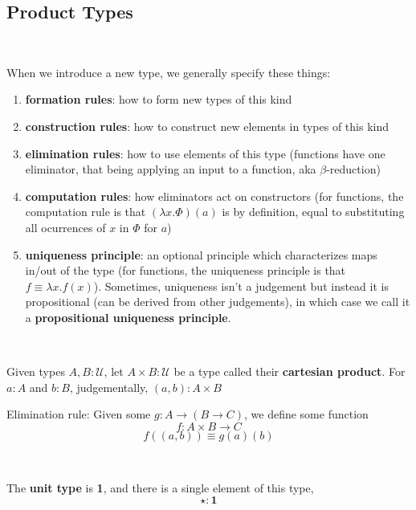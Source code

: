 \documentclass{article}
\begin{document}
\subsection{Product Types}

\begin{remark}
\

When we introduce a new type, we generally specify these things:

\begin{enumerate}
    \item \textbf{formation rules}: how to form new types of this kind
    \item \textbf{construction rules}: how to construct new elements in types of this kind
    \item \textbf{elimination rules}: how to use elements of this type (functions have one eliminator, that being applying an input to a function, aka $\beta$-reduction)
    \item \textbf{computation rules}: how eliminators act on constructors (for functions, the computation rule is that $(\lambda x.\Phi)(a)$ is by definition, equal to substituting all ocurrences of $x$ in $\Phi$ for $a$) 
    \item \textbf{uniqueness principle}: an optional principle which characterizes maps in/out of the type (for functions, the uniqueness principle is that $f \equiv \lambda x.f(x)$). Sometimes, uniqueness isn't a judgement but instead it is propositional (can be derived from other judgements), in which case we call it a \textbf{propositional uniqueness principle}. 
\end{enumerate}
\end{remark}

\begin{definition}
\

Given types $A, B : \mathcal{U}$, let $A \times B: \mathcal{U}$ be a type called their \textbf{cartesian product}. For $a: A$ and $b: B$, judgementally, $(a,b): A \times B$

Elimination rule: Given some $g: A \to (B \to C)$, we define some function $$f: A \times B \to C$$$$f((a,b)) \equiv g(a)(b)$$
\end{definition}

\begin{definition}
\

The \textbf{unit type} is \textbf{1}, and there is a single element of this type, $$\star : \textbf{1}$$
\end{definition}
\end{document}
